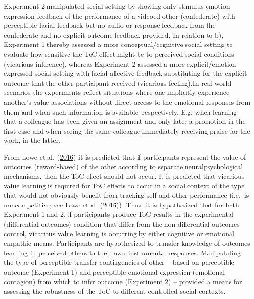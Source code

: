 \documentclass[]{elsarticle} %
\begin{document}
Experiment 2 manipulated social setting by showing only stimulus-emotion
expression feedback of the performance of a videoed other (confederate)
with perceptible facial feedback but no audio or response feedback from
the confederate and no explicit outcome feedback provided. In relation
to b), Experiment 1 thereby assessed a more conceptual/cognitive social
setting to evaluate how sensitive the ToC effect might be to perceived
social conditions (vicarious inference), whereas Experiment 2 assessed a
more explicit/emotion expressed social setting with facial affective
feedback substituting for the explicit outcome that the other
participant received (vicarious feeling).In real world scenarios the
experiments reflect situations where one implicitly experience another's
value associations without direct access to the emotional responses from
them and when such information is available, respectively. E.g. when
learning that a colleague has been given an assignment and only later a
promotion in the first case and when seeing the same colleague
immediately receiving praise for the work, in the latter.

From Lowe et al. (\protect\hyperlink{ref-lowe2016minimalist}{2016}) it
is predicted that if participants represent the value of outcomes
(reward-based) of the other according to separate neuralpsychological
mechanisms, then the ToC effect should not occur. It is predicted that
vicarious value learning is required for ToC effects to occur in a
social context of the type that would not obviously benefit from
tracking self and other performance (i.e.~is noncompetitive; see Lowe et
al. (\protect\hyperlink{ref-lowe2016minimalist}{2016})). Thus, it is
hypothesized that for both Experiment 1 and 2, if participants produce
ToC results in the experimental (differential outcomes) condition that
differ from the non-differential outcomes control, vicarious value
learning is occurring by either cognitive or emotional empathic means.
Participants are hypothesized to transfer knowledge of outcomes learning
in perceived others to their own instrumental responses. Manipulating
the type of perceptible transfer contingencies of other -- based on
perceptible outcome (Experiment 1) and perceptible emotional expression
(emotional contagion) from which to infer outcome (Experiment 2) --
provided a means for assessing the robustness of the ToC to different
controlled social contexts.
\end{document}

